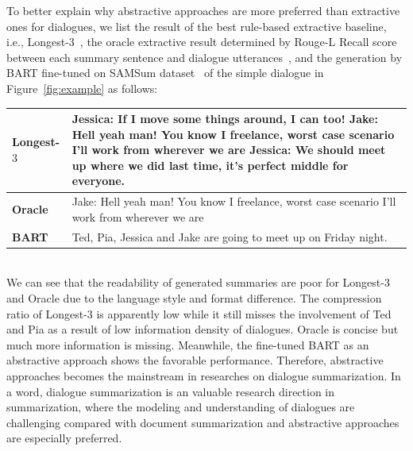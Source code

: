 To better explain why abstractive approaches are more preferred than extractive ones for dialogues, we list the result of the best rule-based extractive baseline, i.e., Longest-$3$~\cite{gliwa2019samsum}, the oracle extractive result determined by Rouge-L Recall score between each summary sentence and dialogue utterances~\cite{chen2018fast}, and the generation by BART fine-tuned on SAMSum dataset~\cite{gliwa2019samsum} of the simple dialogue in Figure~\ref{fig:example} as follows:
\\
\begin{tabular}{|p{1.5cm}|p{\linewidth-2.3cm}|}
	\hline
	\textbf{Longest-$3$} & Jessica: If I move some things around, I can too! Jake: Hell yeah man! You know I freelance, worst case scenario I'll work from wherever we are Jessica: We should meet up where we did last time, it's perfect middle for everyone.\\
	\hline
	\textbf{Oracle} & Jake: Hell yeah man! You know I freelance, worst case scenario I'll work from wherever we are\\
	\hline
	\textbf{BART}& Ted, Pia, Jessica and Jake are going to meet up on Friday night. \\
	\hline
\end{tabular}
\\
We can see that the readability of generated summaries are poor for Longest-$3$ and Oracle due to the language style and format difference. The compression ratio of Longest-$3$ is apparently low while it still misses the involvement of Ted and Pia as a result of low information density of dialogues. Oracle is concise but much more information is missing. Meanwhile, the fine-tuned BART as an abstractive approach shows the favorable performance. Therefore, abstractive approaches becomes the mainstream in researches on dialogue summarization. In a word, dialogue summarization is an valuable research direction in summarization, where the modeling and understanding of dialogues are challenging compared with document summarization and abstractive approaches are especially preferred.

